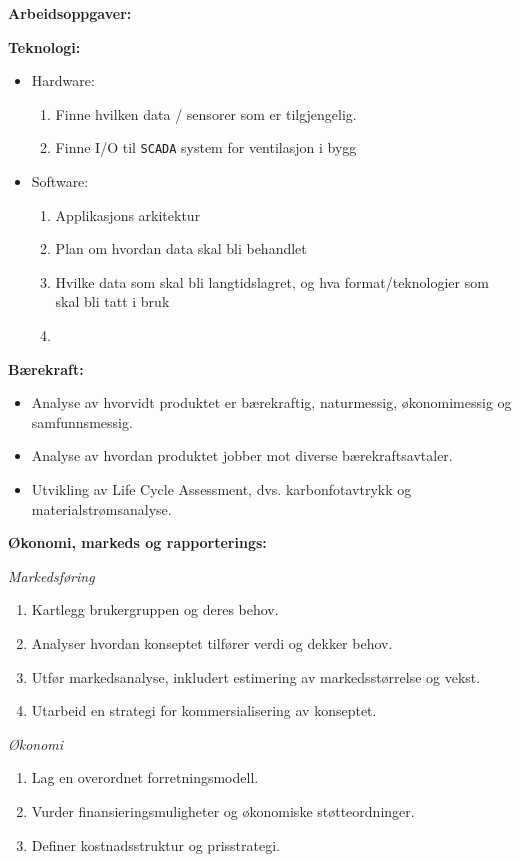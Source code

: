 \textbf{Arbeidsoppgaver:}


\textbf{Teknologi:}
\begin{itemize}
    \item Hardware:
    \begin{enumerate}
        \item Finne hvilken data / sensorer som er tilgjengelig.
        \item Finne I/O til \texttt{SCADA} system for ventilasjon i bygg
    \end{enumerate}
    \noindent
    \item Software:
    \begin{enumerate}
        \item Applikasjons arkitektur
        \item Plan om hvordan data skal bli behandlet
        \item Hvilke data som skal bli langtidslagret, og hva format/teknologier som skal bli tatt i bruk
        \item 
        
    \end{enumerate}
\end{itemize}

\textbf{Bærekraft:}
\begin{itemize}
    \item Analyse av hvorvidt produktet er bærekraftig, naturmessig, økonomimessig og samfunnsmessig.
    \item Analyse av hvordan produktet jobber mot diverse bærekraftsavtaler.
    \item Utvikling av Life Cycle Assessment, dvs. karbonfotavtrykk og materialstrømsanalyse.
\end{itemize}

\textbf{Økonomi, markeds og rapporterings:}

\textit{Markedsføring}
\begin{enumerate}
    \item Kartlegg brukergruppen og deres behov.
    \item Analyser hvordan konseptet tilfører verdi og dekker behov.
    \item Utfør markedsanalyse, inkludert estimering av markedsstørrelse og vekst.
    \item Utarbeid en strategi for kommersialisering av konseptet.
\end{enumerate}


\textit{Økonomi}
\begin{enumerate}
    \item Lag en overordnet forretningsmodell.
    \item Vurder finansieringsmuligheter og økonomiske støtteordninger.
    \item Definer kostnadsstruktur og prisstrategi.
\end{enumerate}


